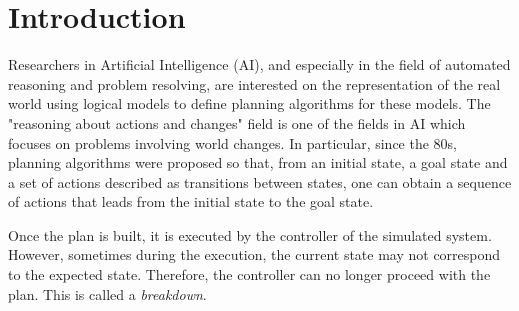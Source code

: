 
\chapter{Introduction} %

\label{Chapter 1} %



Researchers in Artificial Intelligence (AI), and especially in the field of automated reasoning and problem resolving, are interested on the representation of the real world using logical models to define planning algorithms for these models. The "reasoning about actions and changes" field is one of the fields in  AI which focuses on problems involving world changes. In particular, since the 80s, planning algorithms were proposed so that, from an initial state, a goal state and a set of actions described as transitions between states, one can obtain a sequence of actions that leads from the initial state to the goal state.
\par Once the plan is built, it is executed by the controller of the simulated system. However, sometimes during the execution, the current state may not correspond to the expected state. Therefore, the controller can no longer proceed with the plan. This is called a {\em breakdown}.

